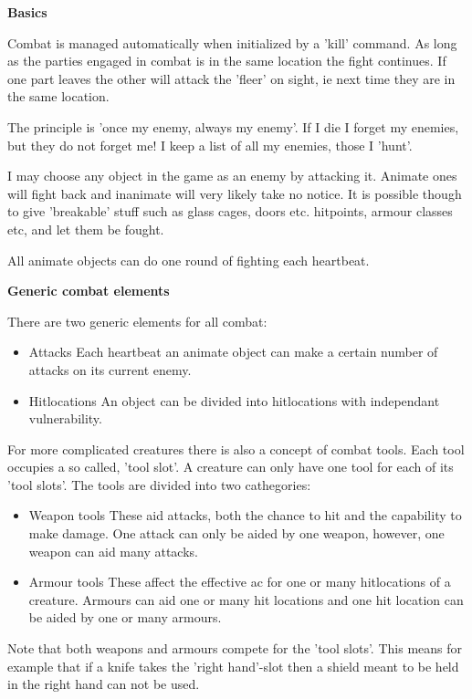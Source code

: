 {\bf Basics}

Combat is managed automatically when initialized by a 'kill' command. As long
as the parties engaged in combat is in the same location the fight continues.
If one part leaves the other will attack the 'fleer' on sight, ie next time
they are in the same location. 

The principle is 'once my enemy, always my enemy'. If I die I forget my 
enemies, but they do not forget me! I keep a list of all my enemies, those
I 'hunt'. 

I may choose any object in the game as an enemy by attacking it. Animate ones
will fight back and inanimate will very likely take no notice. It is possible
though to give 'breakable' stuff such as glass cages, doors etc. hitpoints,
armour classes etc, and let them be fought.

All animate objects can do one round of fighting each heartbeat.

{\bf Generic combat elements}

There are two generic elements for all combat:

\begin{itemize}
    \item  Attacks
               Each heartbeat an animate object can make a certain number
           of attacks on its current enemy. 
    \item  Hitlocations
               An object can be divided into hitlocations with independant
           vulnerability. 
\end{itemize}

For more complicated creatures there is also a concept of combat tools. Each
tool occupies a so called, 'tool slot'. A creature can only have one tool for
each of its 'tool slots'. The tools are divided into two cathegories:

\begin{itemize}
    \item  Weapon tools
        These aid attacks, both the chance to hit and the capability
        to make damage. One attack can only be aided by one weapon,
        however, one weapon can aid many attacks.
    \item  Armour tools
        These affect the effective ac for one or many hitlocations of
        a creature. Armours can aid one or many hit locations and one
        hit location can be aided by one or many armours.
\end{itemize}

Note that both weapons and armours compete for the 'tool slots'. This means
for example that if a knife takes the 'right hand'-slot then a shield meant
to be held in the right hand can not be used.

